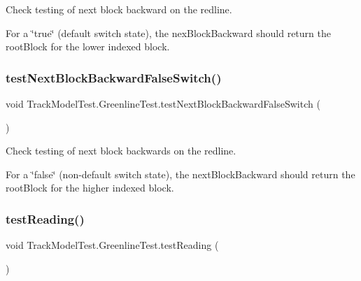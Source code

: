 Check testing of next block backward on the redline. 

For a \char`\"{}true\char`\"{} (default switch state), the nex\+Block\+Backward should return the root\+Block for the lower indexed block. \mbox{\label{classTrackModelTest_1_1GreenlineTest_abd1ef62857c0df3d5df25ac390edce4b}} 
\subsubsection{\texorpdfstring{test\+Next\+Block\+Backward\+False\+Switch()}{testNextBlockBackwardFalseSwitch()}}
{\footnotesize\ttfamily void Track\+Model\+Test.\+Greenline\+Test.\+test\+Next\+Block\+Backward\+False\+Switch (\begin{DoxyParamCaption}{ }\end{DoxyParamCaption})\hspace{0.3cm}{\ttfamily [package]}}



Check testing of next block backwards on the redline. 

For a \char`\"{}false\char`\"{} (non-\/default switch state), the next\+Block\+Backward should return the root\+Block for the higher indexed block. \mbox{\label{classTrackModelTest_1_1GreenlineTest_a2f4824d6b276c671fd1204b6a3050931}} 
\subsubsection{\texorpdfstring{test\+Reading()}{testReading()}}
{\footnotesize\ttfamily void Track\+Model\+Test.\+Greenline\+Test.\+test\+Reading (\begin{DoxyParamCaption}{ }\end{DoxyParamCaption})\hspace{0.3cm}{\ttfamily [package]}}



